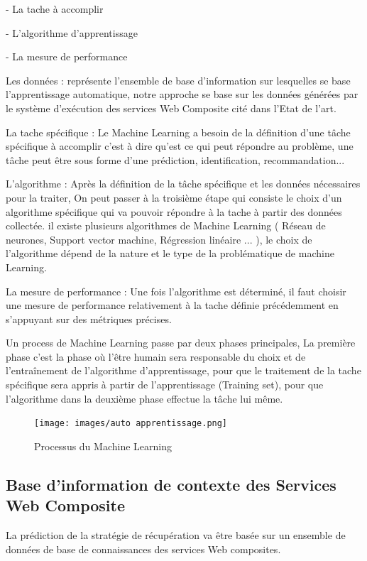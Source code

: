 - La tache à accomplir 

- L'algorithme d'apprentissage

- La mesure de performance


Les données : représente l'ensemble de base d'information sur lesquelles se base l'apprentissage automatique, notre approche se base sur les données générées par le système d'exécution des services Web Composite cité dans l'Etat de l'art.

La tache spécifique : Le Machine Learning a besoin de la définition d'une tâche spécifique à accomplir c'est à dire  qu'est ce qui peut répondre au problème, une tâche peut être sous forme d'une prédiction, identification, recommandation... 

L'algorithme : Après la définition de la tâche spécifique et les données nécessaires pour la traiter, On peut passer à la troisième étape qui consiste le choix d'un algorithme spécifique qui va pouvoir répondre à la tache à partir des données collectée. il existe plusieurs algorithmes de Machine Learning ( Réseau de neurones, Support vector machine, Régression linéaire ... ), le choix de l'algorithme dépend de la nature et le type de la problématique de machine Learning.

La mesure de performance : Une fois l'algorithme est déterminé, il faut choisir une mesure de performance relativement à la tache définie précédemment en s'appuyant sur des métriques précises.  

Un process de Machine Learning passe par deux phases principales, La première phase c'est la phase où l'être humain sera responsable du choix et de l'entraînement de l'algorithme d'apprentissage, pour que le traitement de la tache spécifique sera appris à partir de l'apprentissage (Training set), pour que l'algorithme dans la deuxième phase effectue la tâche lui même.

\begin{figure}[H]
\begin{center}
\texttt{[image: images/auto apprentissage.png]}
\end{center}
\caption{Processus du Machine Learning}
\label{fig:6}
\end{figure}


\subsection{Base d'information de contexte des Services Web Composite}

La prédiction de la stratégie de récupération va être basée sur un ensemble de données de base de connaissances des services Web composites.

